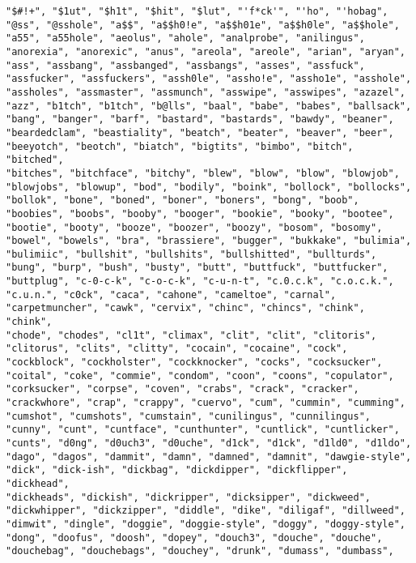 \begin{lstlisting}
"$#!+", "$1ut", "$h1t", "$hit", "$lut", "'f*ck'", "'ho", "'hobag",
"@ss", "@sshole", "a$$", "a$$h0!e", "a$$h01e", "a$$h0le", "a$$hole",
"a55", "a55hole", "aeolus", "ahole", "analprobe", "anilingus",
"anorexia", "anorexic", "anus", "areola", "areole", "arian", "aryan",
"ass", "assbang", "assbanged", "assbangs", "asses", "assfuck",
"assfucker", "assfuckers", "assh0le", "assho!e", "assho1e", "asshole",
"assholes", "assmaster", "assmunch", "asswipe", "asswipes", "azazel",
"azz", "b1tch", "b1tch", "b@lls", "baal", "babe", "babes", "ballsack",
"bang", "banger", "barf", "bastard", "bastards", "bawdy", "beaner",
"beardedclam", "beastiality", "beatch", "beater", "beaver", "beer",
"beeyotch", "beotch", "biatch", "bigtits", "bimbo", "bitch", "bitched",
"bitches", "bitchface", "bitchy", "blew", "blow", "blow", "blowjob",
"blowjobs", "blowup", "bod", "bodily", "boink", "bollock", "bollocks",
"bollok", "bone", "boned", "boner", "boners", "bong", "boob",
"boobies", "boobs", "booby", "booger", "bookie", "booky", "bootee",
"bootie", "booty", "booze", "boozer", "boozy", "bosom", "bosomy",
"bowel", "bowels", "bra", "brassiere", "bugger", "bukkake", "bulimia",
"bulimiic", "bullshit", "bullshits", "bullshitted", "bullturds",
"bung", "burp", "bush", "busty", "butt", "buttfuck", "buttfucker",
"buttplug", "c-0-c-k", "c-o-c-k", "c-u-n-t", "c.0.c.k", "c.o.c.k.",
"c.u.n.", "c0ck", "caca", "cahone", "cameltoe", "carnal",
"carpetmuncher", "cawk", "cervix", "chinc", "chincs", "chink", "chink",
"chode", "chodes", "cl1t", "climax", "clit", "clit", "clitoris",
"clitorus", "clits", "clitty", "cocain", "cocaine", "cock",
"cockblock", "cockholster", "cockknocker", "cocks", "cocksucker",
"coital", "coke", "commie", "condom", "coon", "coons", "copulator",
"corksucker", "corpse", "coven", "crabs", "crack", "cracker",
"crackwhore", "crap", "crappy", "cuervo", "cum", "cummin", "cumming",
"cumshot", "cumshots", "cumstain", "cunilingus", "cunnilingus",
"cunny", "cunt", "cuntface", "cunthunter", "cuntlick", "cuntlicker",
"cunts", "d0ng", "d0uch3", "d0uche", "d1ck", "d1ck", "d1ld0", "d1ldo",
"dago", "dagos", "dammit", "damn", "damned", "damnit", "dawgie-style",
"dick", "dick-ish", "dickbag", "dickdipper", "dickflipper", "dickhead",
"dickheads", "dickish", "dickripper", "dicksipper", "dickweed",
"dickwhipper", "dickzipper", "diddle", "dike", "diligaf", "dillweed",
"dimwit", "dingle", "doggie", "doggie-style", "doggy", "doggy-style",
"dong", "doofus", "doosh", "dopey", "douch3", "douche", "douche",
"douchebag", "douchebags", "douchey", "drunk", "dumass", "dumbass",

\end{lstlisting}
